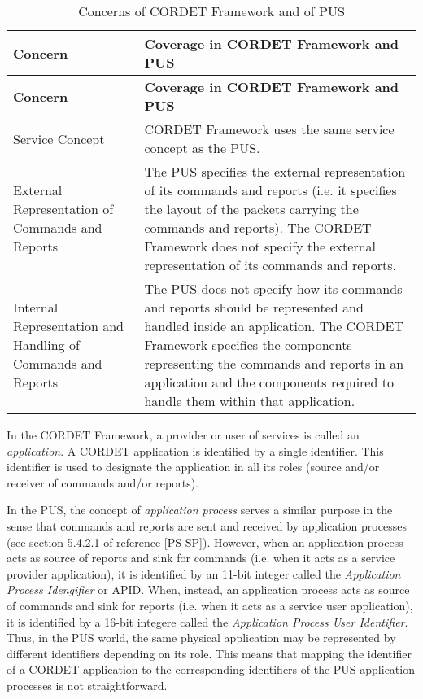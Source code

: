 \begin{longtable}{|>{\raggedright\arraybackslash}p{3cm}|p{10cm}|}
\caption{Concerns of CORDET Framework and of PUS}\label{tab:PusCrConcerns} \\
\hline
\rowcolor{light-gray}
\textbf{Concern} & \textbf{Coverage in CORDET Framework and PUS}\\
\hline\hline
\endfirsthead
\rowcolor{light-gray}
\textbf{Concern} & \textbf{Coverage in CORDET Framework and PUS}\\
\hline\hline
\endhead
Service Concept & CORDET Framework uses the same service concept as the PUS.\\
\hline
External Representation of Commands and Reports & The PUS specifies the external representation of its commands and reports (i.e. it specifies the layout of the packets carrying the commands and reports). The CORDET Framework does not specify the external representation of its commands and reports.\\
\hline
Internal Representation and Handling of Commands and Reports & The PUS does not specify how its commands and reports should be represented and handled inside an application. The CORDET Framework specifies the components representing the commands and reports in an application and the components required to handle them within that application.\\
\hline
\end{longtable}

In the CORDET Framework, a provider or user of services is called an \textit{application}. A CORDET application is identified by a single identifier. This identifier is used to designate the application in all its roles (source and/or receiver of commands and/or reports). 

In the PUS, the concept of \textit{application process} serves a similar purpose in the sense that commands and reports are sent and received by application processes (see section 5.4.2.1 of reference [PS-SP]). However, when an application process acts as source of reports and sink for commands (i.e. when it acts as a service provider application), it is identified by an 11-bit integer called the \textit{Application Process Idengifier} or APID. When, instead, an application process acts as source of commands and sink for reports (i.e. when it acts as a service user application), it is identified by a 16-bit integere called the \textit{Application Process User Identifier}. Thus, in the PUS world, the same physical application may be represented by different identifiers depending on its role. This means that mapping the identifier of a CORDET application to the corresponding identifiers of the PUS application processes is not straightforward.  

